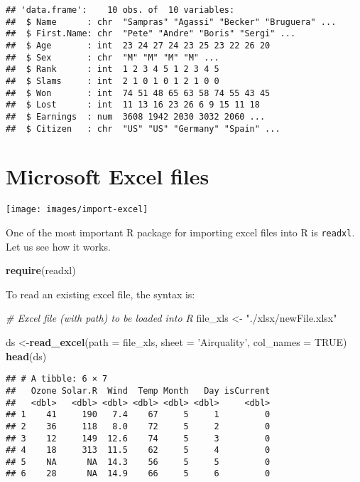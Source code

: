 \documentclass[]{book}
\newenvironment{Shaded}{\begin{snugshade}}{\end{snugshade}}
\newcommand{\KeywordTok}[1]{\textcolor[rgb]{0.13,0.29,0.53}{\textbf{{#1}}}}
\newcommand{\DataTypeTok}[1]{\textcolor[rgb]{0.13,0.29,0.53}{{#1}}}
\newcommand{\StringTok}[1]{\textcolor[rgb]{0.31,0.60,0.02}{{#1}}}
\newcommand{\CommentTok}[1]{\textcolor[rgb]{0.56,0.35,0.01}{\textit{{#1}}}}
\newcommand{\OtherTok}[1]{\textcolor[rgb]{0.56,0.35,0.01}{{#1}}}
\newcommand{\NormalTok}[1]{{#1}}
\begin{document}
\begin{verbatim}
## 'data.frame':    10 obs. of  10 variables:
##  $ Name      : chr  "Sampras" "Agassi" "Becker" "Bruguera" ...
##  $ First.Name: chr  "Pete" "Andre" "Boris" "Sergi" ...
##  $ Age       : int  23 24 27 24 23 25 23 22 26 20
##  $ Sex       : chr  "M" "M" "M" "M" ...
##  $ Rank      : int  1 2 3 4 5 1 2 3 4 5
##  $ Slams     : int  2 1 0 1 0 1 2 1 0 0
##  $ Won       : int  74 51 48 65 63 58 74 55 43 45
##  $ Lost      : int  11 13 16 23 26 6 9 15 11 18
##  $ Earnings  : num  3608 1942 2030 3032 2060 ...
##  $ Citizen   : chr  "US" "US" "Germany" "Spain" ...
\end{verbatim}

\section{Microsoft Excel files}\label{microsoft-excel-files}

\texttt{[image: images/import-excel]}

One of the most important R package for importing excel files into R is
\texttt{readxl}. Let us see how it works.

\begin{Shaded}
\begin{Highlighting}[]
\KeywordTok{require}\NormalTok{(readxl)}
\end{Highlighting}
\end{Shaded}

To read an existing excel file, the syntax is:

\begin{Shaded}
\begin{Highlighting}[]
\CommentTok{# Excel file (with path) to be loaded into R}
\NormalTok{file_xls <-}\StringTok{ "./xlsx/newFile.xlsx"}
\end{Highlighting}
\end{Shaded}

\begin{Shaded}
\begin{Highlighting}[]
\NormalTok{ds <-}\KeywordTok{read_excel}\NormalTok{(}\DataTypeTok{path =} \NormalTok{file_xls, }\DataTypeTok{sheet =} \StringTok{'Airquality'}\NormalTok{, }\DataTypeTok{col_names =} \OtherTok{TRUE}\NormalTok{)}
\KeywordTok{head}\NormalTok{(ds)}
\end{Highlighting}
\end{Shaded}

\begin{verbatim}
## # A tibble: 6 × 7
##   Ozone Solar.R  Wind  Temp Month   Day isCurrent
##   <dbl>   <dbl> <dbl> <dbl> <dbl> <dbl>     <dbl>
## 1    41     190   7.4    67     5     1         0
## 2    36     118   8.0    72     5     2         0
## 3    12     149  12.6    74     5     3         0
## 4    18     313  11.5    62     5     4         0
## 5    NA      NA  14.3    56     5     5         0
## 6    28      NA  14.9    66     5     6         0
\end{verbatim}
\end{document}
